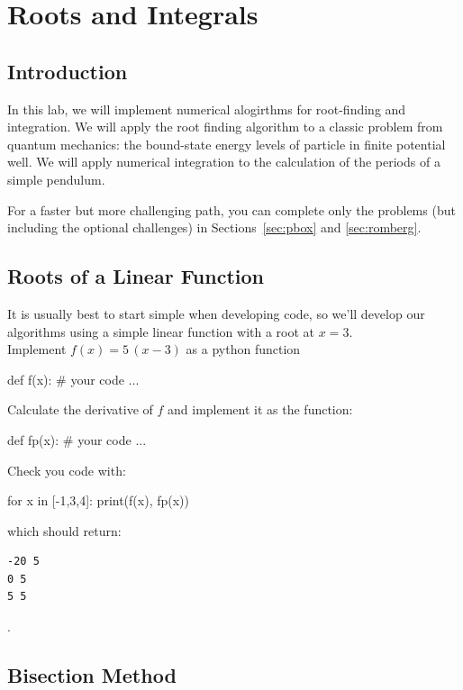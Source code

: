 \chapter{Roots and Integrals}

\section{Introduction}

In this lab, we will implement numerical alogirthms for root-finding
and integration.  We will apply the root finding algorithm to a
classic problem from quantum mechanics: the bound-state energy levels
of particle in finite potential well.  We will apply numerical
integration to the calculation of the periods of a simple pendulum.

For a faster but more challenging path, you can complete only the
problems (but including the optional challenges) in
Sections~\ref{sec:pbox} and \ref{sec:romberg}.

\section{Roots of a Linear Function}

It is usually best to start simple when developing code, so we'll develop our algorithms using a simple linear function with a root at $x=3$.\\

\plot Implement $f(x)=5\,(x-3)$ as a python function
\begin{python}
def f(x):
   # your code ...
\end{python}
Calculate the derivative of $f$ and implement it as the function:
\begin{python}
def fp(x):
   # your code ...
\end{python}
Check you code with:
\begin{python}
for x in [-1,3,4]:
    print(f(x), fp(x))
\end{python}
which should return:
\begin{verbatim}
-20 5
0 5
5 5
\end{verbatim}.

\section{Bisection Method}

